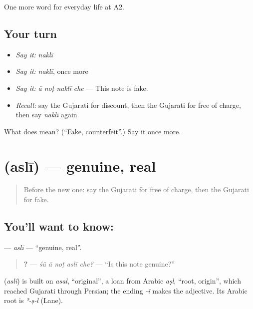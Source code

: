 \begin{grammarlens}[title={What you've built}]
One more word for everyday life at A2.
\end{grammarlens}

\subsection*{Your turn}
\begin{itemize}
\raggedright
  \item \emph{Say it:} \emph{naklī}
  \item \emph{Say it:} \emph{naklī}, once more
  \item \emph{Say it:} \emph{ā noṭ naklī che} — This note is fake.
  \item \emph{Recall:} say the Gujarati for discount, then the Gujarati for free of charge, then say \emph{naklī} again
\end{itemize}

\begin{tcolorbox}[breakable,colback=teal!4,colframe=teal!35!black,title={Before you move on}]
What does  mean? (\textquotedblleft{}Fake, counterfeit\textquotedblright{}.) Say it once more.
\end{tcolorbox}
\section[\texorpdfstring{\gu{અસલી} (aslī)}{અસલી (aslī)}]{ (aslī) — genuine, real}

\label{lesson:GU-C188-asli}



\begin{quote}
Before the new one: say the Gujarati for free of charge, then the Gujarati for fake.
\end{quote}

\subsection*{You'll want to know: }
\textbf{} — \emph{aslī} — \textquotedblleft{}genuine, real\textquotedblright{}.

\begin{quote}
\textbf{    ?} — \emph{śũ ā noṭ aslī che?} — \textquotedblleft{}Is this note genuine?\textquotedblright{}
\end{quote}

\begin{cousinweb}
\textbf{} (\emph{aslī}) is built on \emph{asal}, \textquotedblleft{}original\textquotedblright{}, a loan from Arabic \emph{aṣl}, \textquotedblleft{}root, origin\textquotedblright{}, which reached Gujarati through Persian; the ending \emph{-ī} makes the adjective. Its Arabic root is \emph{ʾ-ṣ-l} (Lane).
\end{cousinweb}

